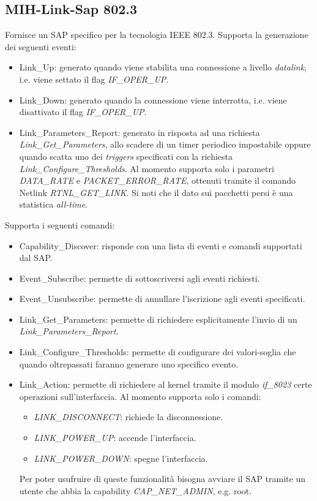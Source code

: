 \subsection{MIH-Link-Sap 802.3}
Fornisce un SAP specifico per la tecnologia IEEE 802.3. Supporta la generazione dei seguenti eventi:
\begin{itemize}
\item Link\_Up: generato quando viene stabilita una connessione a livello {\em datalink}, i.e. viene settato il flag {\em IF\_OPER\_UP}.
\item Link\_Down: generato quando la connessione viene interrotta, i.e. viene disattivato il flag {\em IF\_OPER\_UP}.
\item Link\_Parameters\_Report: generato in risposta ad una richiesta \\{\em Link\_Get\_Parameters}, allo scadere di un timer periodico impostabile oppure quando scatta uno dei {\em triggers} specificati con la richiesta {\em Link\_Configure\_Thresholds}. Al momento supporta solo i parametri {\em DATA\_RATE} e {\em PACKET\_ERROR\_RATE}, ottenuti tramite il comando Netlink {\em RTNL\_GET\_LINK}. Si noti che il dato sui pacchetti persi è una statistica {\em all-time}.
\end{itemize}
Supporta i seguenti comandi:
\begin{itemize}
\item Capability\_Discover: risponde con una lista di eventi e comandi supportati dal SAP.
\item Event\_Subscribe: permette di sottoscriversi agli eventi richiesti.
\item Event\_Unsubscribe: permette di annullare l'iscrizione agli eventi specificati.
\item Link\_Get\_Parameters: permette di richiedere esplicitamente l'invio di un {\em Link\_Parameters\_Report}.
\item Link\_Configure\_Thresholds: permette di configurare dei valori-soglia che quando oltrepassati faranno generare uno specifico evento.
\item Link\_Action: permette di richiedere al kernel tramite il modulo {\em if\_8023} certe operazioni sull'interfaccia. Al momento supporta solo i comandi:
\begin{itemize}
\item {\em LINK\_DISCONNECT}: richiede la disconnessione.
\item {\em LINK\_POWER\_UP}: accende l'interfaccia.
\item {\em LINK\_POWER\_DOWN}: spegne l'interfaccia.
\end{itemize}
Per poter usufruire di queste funzionalità bisogna avviare il SAP tramite un utente che abbia la capability {\em CAP\_NET\_ADMIN}, e.g. root.
\end{itemize}

